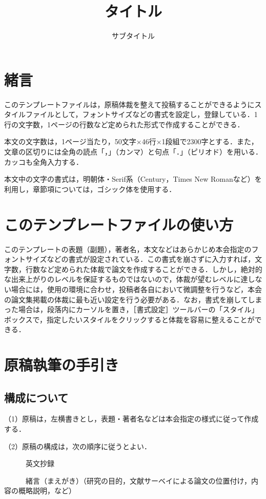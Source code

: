 \documentclass[a4jsme, fleqn]{jsmepaper}
\title{
    \vspace{-20pt}
    タイトル
}
\subtitle{サブタイトル}
\begin{document}
\maketitle
\thispagestyle{fancy}
%
%
\section{緒言}

このテンプレートファイルは，原稿体裁を整えて投稿することができるようにスタイルファイルとして，フォントサイズなどの書式を設定し，登録している．1行の文字数，1ページの行数など定められた形式で作成することができる．

本文の文字数は，1ページ当たり，50文字×46行×1段組で2300字とする．また，文章の区切りには全角の読点「，」（カンマ）と句点「．」（ピリオド）を用いる．カッコも全角入力する．

本文中の文字の書式は，明朝体・Serif系（Century，Times New Romanなど）を利用し，章節項については，ゴシック体を使用する．

\section{このテンプレートファイルの使い方}

このテンプレートの表題（副題），著者名，本文などはあらかじめ本会指定のフォントサイズなどの書式が設定されている．この書式を崩さずに入力すれば，文字数，行数など定められた体裁で論文を作成することができる．しかし，絶対的な出来上がりのレベルを保証するものではないので，体裁が望むレベルに達しない場合には，使用の環境に合わせ，投稿者各自において微調整を行うなど，本会の論文集掲載の体裁に最も近い設定を行う必要がある．なお，書式を崩してしまった場合は，段落内にカーソルを置き，［書式設定］ツールバーの「スタイル」ボックスで，指定したいスタイルをクリックすると体裁を容易に整えることができる．

\section{原稿執筆の手引き}
\subsection{構成について}
（1）原稿は，左横書きとし，表題・著者名などは本会指定の様式に従って作成する．

（2）原稿の構成は，次の順序に従うとよい．

　　　英文抄録

　　　緒言（まえがき）（研究の目的，文献サーベイによる論文の位置付け，内容の概略説明，など）
\end{document}
